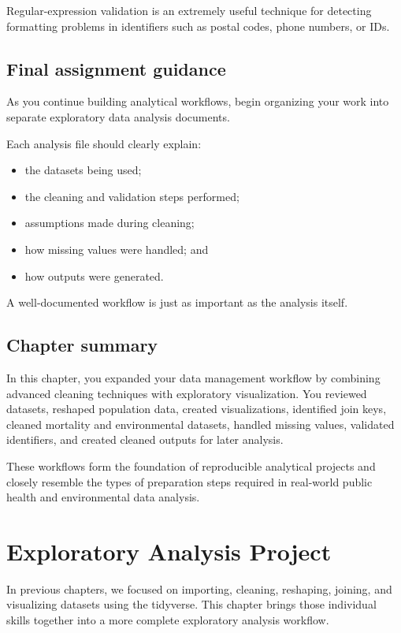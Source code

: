 \documentclass[
  11pt,
  oneside]{book}
\providecommand{\tightlist}{%
  \setlength{\itemsep}{0pt}\setlength{\parskip}{0pt}}
\begin{document}
Regular-expression validation is an extremely useful technique for detecting formatting problems in identifiers such as postal codes, phone numbers, or IDs.

\section{Final assignment guidance}\label{final-assignment-guidance}

As you continue building analytical workflows, begin organizing your work into separate exploratory data analysis documents.

Each analysis file should clearly explain:

\begin{itemize}
\tightlist
\item
  the datasets being used;
\item
  the cleaning and validation steps performed;
\item
  assumptions made during cleaning;
\item
  how missing values were handled; and
\item
  how outputs were generated.
\end{itemize}

A well-documented workflow is just as important as the analysis itself.

\section{Chapter summary}\label{chapter-summary-5}

In this chapter, you expanded your data management workflow by combining advanced cleaning techniques with exploratory visualization. You reviewed datasets, reshaped population data, created visualizations, identified join keys, cleaned mortality and environmental datasets, handled missing values, validated identifiers, and created cleaned outputs for later analysis.

These workflows form the foundation of reproducible analytical projects and closely resemble the types of preparation steps required in real-world public health and environmental data analysis.

\chapter{Exploratory Analysis Project}\label{exploratory-analysis-project}

In previous chapters, we focused on importing, cleaning, reshaping, joining, and visualizing datasets using the tidyverse. This chapter brings those individual skills together into a more complete exploratory analysis workflow.
\end{document}
